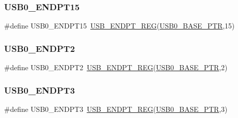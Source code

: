 \subsubsection{\texorpdfstring{U\+S\+B0\+\_\+\+E\+N\+D\+P\+T15}{USB0\_ENDPT15}}
{\footnotesize\ttfamily \#define U\+S\+B0\+\_\+\+E\+N\+D\+P\+T15~\hyperlink{group___u_s_b___register___accessor___macros_ga93e8b132ffc209ad3ba99ba2cbf4f990}{U\+S\+B\+\_\+\+E\+N\+D\+P\+T\+\_\+\+R\+EG}(\hyperlink{group___u_s_b___peripheral_ga598ff5eb20a0551af232710b3f27640a}{U\+S\+B0\+\_\+\+B\+A\+S\+E\+\_\+\+P\+TR},15)}

\mbox{\label{group___u_s_b___register___accessor___macros_gab5fdecb68ea62e6025b886d75c5c9417}} 
\subsubsection{\texorpdfstring{U\+S\+B0\+\_\+\+E\+N\+D\+P\+T2}{USB0\_ENDPT2}}
{\footnotesize\ttfamily \#define U\+S\+B0\+\_\+\+E\+N\+D\+P\+T2~\hyperlink{group___u_s_b___register___accessor___macros_ga93e8b132ffc209ad3ba99ba2cbf4f990}{U\+S\+B\+\_\+\+E\+N\+D\+P\+T\+\_\+\+R\+EG}(\hyperlink{group___u_s_b___peripheral_ga598ff5eb20a0551af232710b3f27640a}{U\+S\+B0\+\_\+\+B\+A\+S\+E\+\_\+\+P\+TR},2)}

\mbox{\label{group___u_s_b___register___accessor___macros_ga19408dcc4044b88668fe487335f0952e}} 
\subsubsection{\texorpdfstring{U\+S\+B0\+\_\+\+E\+N\+D\+P\+T3}{USB0\_ENDPT3}}
{\footnotesize\ttfamily \#define U\+S\+B0\+\_\+\+E\+N\+D\+P\+T3~\hyperlink{group___u_s_b___register___accessor___macros_ga93e8b132ffc209ad3ba99ba2cbf4f990}{U\+S\+B\+\_\+\+E\+N\+D\+P\+T\+\_\+\+R\+EG}(\hyperlink{group___u_s_b___peripheral_ga598ff5eb20a0551af232710b3f27640a}{U\+S\+B0\+\_\+\+B\+A\+S\+E\+\_\+\+P\+TR},3)}

